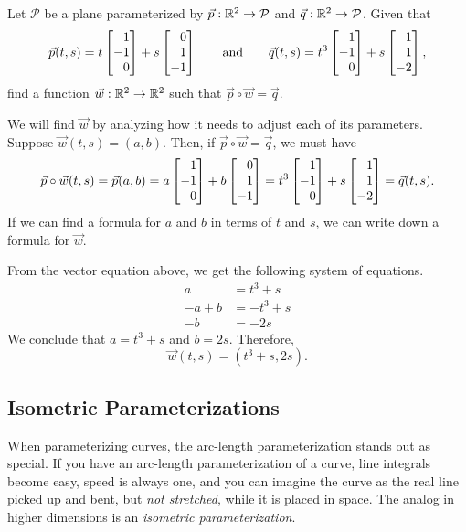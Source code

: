 \begin{example}
	Let $\mathcal P$ be a plane parameterized by $\vec p:\mathbb{R}^2\to\mathcal P$ and $\vec q:\mathbb{R}^2\to\mathcal P$.
	Given that
	\[
		\vec p(t,s) =  t\mat{1\\-1\\0} + s\mat{0\\1\\-1}\qquad\text{and}\qquad
		\vec q(t,s) =  t^3\mat{1\\-1\\0} + s\mat{1\\1\\-2},
	\]
	find a function $\vec w:\mathbb{R}^2\to\mathbb{R}^2$ such that $\vec p\circ \vec w=\vec q$.

	 We will find $\vec w$ by analyzing how it needs to adjust each of its parameters.
	Suppose $\vec w(t,s)=(a,b)$.  Then, if $\vec p\circ\vec w = \vec q$, we must have
	\[
		\vec p\circ \vec w(t,s) = \vec p(a,b) = a\mat{1\\-1\\0}+b\mat{0\\1\\-1}
		=t^3\mat{1\\-1\\0}+s\mat{1\\1\\-2}=\vec q(t,s).
	\]
	If we can find a formula for $a$ and $b$ in terms of $t$ and $s$, we can write down
	a formula for $\vec w$.

	From the vector equation above, we get the following system of equations.
	\begin{align*}
		a &= t^3+s\\
		-a+b&=-t^3+s\\
		-b&=-2s
	\end{align*}
	We conclude that $a=t^3+s$ and $b=2s$.  Therefore,
	\[
		\vec w(t,s) = (t^3+s, 2s).
	\]
\end{example}

\subsection{Isometric Parameterizations}

When parameterizing curves, the arc-length parameterization stands out as special.  If
you have an arc-length parameterization of a curve, line integrals become easy, speed is always one,
and you can imagine the curve as the real line picked up and bent, but \emph{not stretched}, while it is
placed in space.  The analog in higher dimensions is an \emph{isometric parameterization}.

